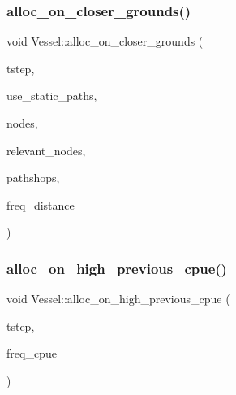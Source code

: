 \subsubsection{\texorpdfstring{alloc\_on\_closer\_grounds()}{alloc\_on\_closer\_grounds()}}
{\footnotesize\ttfamily void Vessel\+::alloc\+\_\+on\+\_\+closer\+\_\+grounds (\begin{DoxyParamCaption}\item[{int}]{tstep,  }\item[{int}]{use\+\_\+static\+\_\+paths,  }\item[{vector$<$ \mbox{\hyperlink{class_node}{Node}} $\ast$ $>$ \&}]{nodes,  }\item[{const std\+::vector$<$ \mbox{\hyperlink{classtypes_1_1_node_id}{types\+::\+Node\+Id}} $>$ \&}]{relevant\+\_\+nodes,  }\item[{const std\+::vector$<$ \mbox{\hyperlink{class_path_shop}{Path\+Shop}} $>$ \&}]{pathshops,  }\item[{std\+::ofstream \&}]{freq\+\_\+distance }\end{DoxyParamCaption})}

\mbox{\label{class_vessel_aa1b36bd9af5a719e2be270ce60d29ef2}} 
\subsubsection{\texorpdfstring{alloc\_on\_high\_previous\_cpue()}{alloc\_on\_high\_previous\_cpue()}}
{\footnotesize\ttfamily void Vessel\+::alloc\+\_\+on\+\_\+high\+\_\+previous\+\_\+cpue (\begin{DoxyParamCaption}\item[{int}]{tstep,  }\item[{std\+::ofstream \&}]{freq\+\_\+cpue }\end{DoxyParamCaption})}

\mbox{\label{class_vessel_a1c7eadacea9b3844cf38a2bbe228e5ab}} 
